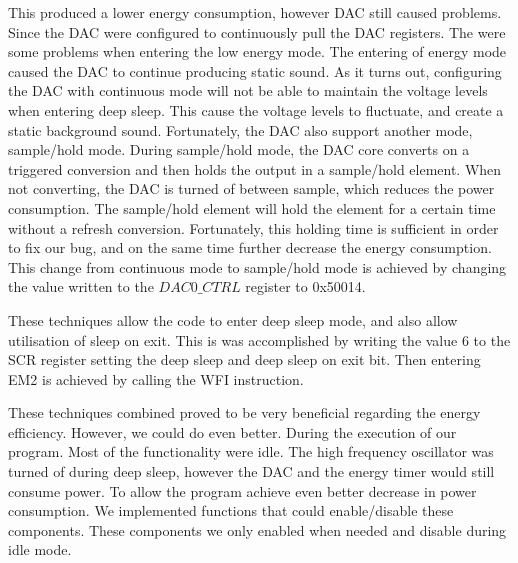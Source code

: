 This produced a lower energy consumption, however DAC still caused problems. Since the DAC were configured to continuously pull the DAC registers. The were some problems when entering the low energy mode. The entering of energy mode caused the DAC to continue producing static sound. As it turns out, configuring the DAC with continuous mode will not be able to maintain the voltage levels when entering deep sleep. This cause the voltage levels to fluctuate, and create a static background sound. Fortunately, the DAC also support another mode, sample/hold mode. During sample/hold mode, the DAC core converts on a triggered conversion and then holds the output in a sample/hold element. When not converting, the DAC is turned of between sample, which reduces the power consumption. The sample/hold element will hold the element for a certain time without a refresh conversion\cite{EFM32GG-rm}. Fortunately, this holding time is sufficient in order to fix our bug, and on the same time further decrease the energy consumption. This change from continuous mode to sample/hold mode is achieved by changing the value written to the $DAC0\_CTRL$ register to 0x50014. 



These techniques allow the code to enter deep sleep mode, and also allow utilisation of sleep on exit. This is was accomplished by writing the value 6 to the SCR register setting the deep sleep and deep sleep on exit bit. Then entering EM2 is achieved by calling the WFI instruction.

These techniques combined proved to be very beneficial regarding the energy efficiency. However, we could do even better. During the execution of our program. Most of the functionality were idle. The high frequency oscillator was turned of during deep sleep, however the DAC and the energy timer would still consume power. To allow the program achieve even better decrease in power consumption. We implemented functions that could enable/disable these components. These components we only enabled when needed and disable during idle mode. 



 

  





   



  
       

 



